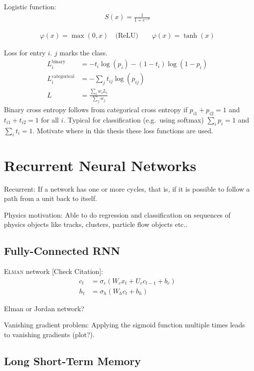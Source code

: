 Logistic function:
\begin{align*}
  S(x) = \frac{1}{1 + e^{-x}}
\end{align*}

\begin{align*}
  \varphi(x) = \max(0, x) \quad \text{(ReLU)} \qquad \varphi(x) = \tanh(x)
\end{align*}

Loss for entry $i$. $j$ marks the class.
\begin{align*}
  L_i^\mathrm{binary} &= -t_i \log(p_i) - (1 - t_i) \log(1 - p_i) \\
  L_i^\mathrm{categorical} &= - \sum_j t_{ij} \log(p_{ij}) \\
  L &= \frac{\sum_i w_i L_i}{\sum_j w_j}
\end{align*}
Binary cross entropy follows from categorical cross entropy if
$p_{i1} + p_{i2} = 1$ and $t_{i1} + t_{i2} = 1$ for all $i$. Typical for
classification (e.g.\ using softmax) $\sum_i p_i = 1$ and $\sum_i t_i = 1$.
Motivate where in this thesis these loss functions are used.

\section{Recurrent Neural Networks}
\label{sec:rnn}

Recurrent: If a network has one or more cycles, that is, if it is possible to
follow a path from a unit back to itself.

Physics motivation: Able to do regression and classification on sequences of
physics objects like tracks, clusters, particle flow objects etc..

\subsection{Fully-Connected RNN}
\label{sec:fully_connected_rnn}

\textsc{Elman} network [Check Citation]\cite{elman}:
\begin{align*}
  c_t &= \sigma_c(W_c x_t + U_c c_{t-1} + b_c) \\
  h_t &= \sigma_h(W_h c_t + b_h)
\end{align*}

Elman or Jordan network?

Vanishing gradient problem: Applying the sigmoid function multiple times leads
to vanishing gradients (plot?).

\subsection{Long Short-Term Memory}
\label{sec:lstm}


